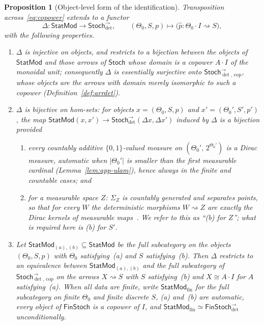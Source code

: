 \documentclass[11pt,a4paper]{article}
\theoremstyle{plain}
\newtheorem{proposition}[theorem]{Proposition}
\theoremstyle{definition}
\theoremstyle{remark}
\newcommand{\cat}[1]{\mathsf{#1}}
\newcommand{\Stoch}{\cat{Stoch}}
\newcommand{\FinStoch}{\cat{FinStoch}}
\newcommand{\StatMod}{\cat{StatMod}}
\newcommand{\Jc}{\Delta}            %
\newcommand{\Arrdet}[1]{#1^{\rightarrow}_{\det}}
\newcommand{\Arrcop}[1]{#1^{\rightarrow}_{\det,\,\mathrm{cop}}}
\begin{document}
\begin{proposition}[Object-level form of the identification]\label{wprop:copower}
Transposition across~\eqref{eq:copower} extends to a functor
\[
\Jc \colon \StatMod \longrightarrow \Arrdet{\Stoch},
\qquad
(\Theta_0, S, p) \longmapsto
\bigl(\widehat{p} \colon \Theta_0 \cdot I \rightsquigarrow S\bigr),
\]
with the following properties.
\begin{enumerate}
\item $\Jc$ is injective on objects, and restricts to a bijection between the
objects of $\StatMod$ and those arrows of $\Stoch$ whose domain \emph{is} a
copower $A \cdot I$ of the monoidal unit; consequently $\Jc$ is essentially
surjective onto $\Arrcop{\Stoch}$, whose objects are the arrows with domain
merely isomorphic to such a copower (Definition~\ref{def:arrdet}).
\item $\Jc$ is bijective on hom-sets: for objects $x = (\Theta_0,S,p)$ and
$x' = (\Theta_0',S',p')$, the map $\StatMod(x,x') \to \Arrdet{\Stoch}(\Jc x,\Jc x')$
induced by $\Jc$ is a bijection provided
\begin{enumerate}
\item[(a)] every countably additive $\{0,1\}$-valued measure on
$(\Theta_0',\,2^{\Theta_0'})$ is a Dirac measure, automatic when
$|\Theta_0'|$ is smaller than the first measurable cardinal
(Lemma~\ref{lem:app-ulam}), hence always in the finite and countable cases;
and
\item[(b)] for a measurable space $Z$: $\Sigma_{Z}$ is countably generated and
separates points, so that for every $W$ the deterministic morphisms
$W \rightsquigarrow Z$ are exactly the Dirac kernels of measurable
maps~\cite[Ex.~10.4]{fritz_synthetic_2020}. We refer to this as ``(b) for
$Z$''; what is required here is (b) for $S'$.
\end{enumerate}
\item Let $\StatMod_{(a),(b)} \subseteq \StatMod$ be the full subcategory on
the objects $(\Theta_0,S,p)$ with $\Theta_0$ satisfying~(a) and $S$
satisfying~(b). Then $\Jc$ restricts to an equivalence between
$\StatMod_{(a),(b)}$ and the full subcategory of $\Arrcop{\Stoch}$ on the
arrows $X \rightsquigarrow S$ with $S$ satisfying~(b) and $X \cong A\cdot I$
for $A$ satisfying~(a). When all data are finite, write
$\StatMod_{\mathrm{fin}}$ for the full subcategory on finite $\Theta_0$ and
finite discrete $S$, (a) and~(b) are automatic, every object of
$\FinStoch$ is a copower of $I$, and
$\StatMod_{\mathrm{fin}} \simeq \Arrdet{\FinStoch}$ unconditionally.
\end{enumerate}
\end{proposition}
\end{document}
